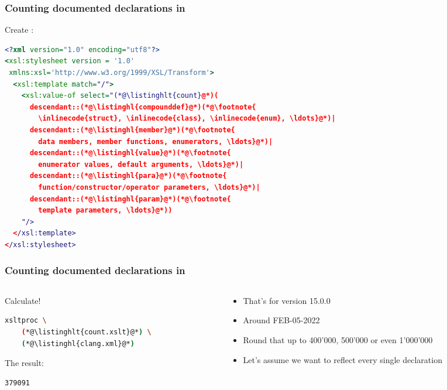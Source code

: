 \documentclass[compress,table,xcolor=table]{beamer}
\begin{document}
\begin{frame}[fragile]
  \frametitle{Counting documented declarations in }
  Create :
  \begin{lstlisting}[language=xslt,basicstyle=\scriptsize\ttfamily]
<?xml version="1.0" encoding="utf8"?>
<xsl:stylesheet version = '1.0'
 xmlns:xsl='http://www.w3.org/1999/XSL/Transform'>
  <xsl:template match="/">
    <xsl:value-of select="(*@\listinghlt{count}@*)(
      descendant::(*@\listinghl{compounddef}@*)(*@\footnote{
        \inlinecode{struct}, \inlinecode{class}, \inlinecode{enum}, \ldots}@*)|
      descendant::(*@\listinghl{member}@*)(*@\footnote{
        data members, member functions, enumerators, \ldots}@*)|
      descendant::(*@\listinghl{value}@*)(*@\footnote{
        enumerator values, default arguments, \ldots}@*)|
      descendant::(*@\listinghl{para}@*)(*@\footnote{
        function/constructor/operator parameters, \ldots}@*)|
      descendant::(*@\listinghl{param}@*)(*@\footnote{
        template parameters, \ldots}@*))
    "/>
  </xsl:template>
</xsl:stylesheet>
  \end{lstlisting}
\end{frame}
\begin{frame}[fragile]
  \frametitle{Counting documented declarations in }
  \begin{columns}
    \begin{column}{.35\textwidth}
      \Large
      Calculate!
      \begin{lstlisting}[language=bash,basicstyle=\small\ttfamily]
xsltproc \
    (*@\listinghlt{count.xslt}@*) \
    (*@\listinghl{clang.xml}@*)
      \end{lstlisting}
      The result:
      \begin{verbatim}
379091
      \end{verbatim}
    \end{column}
    \begin{column}{.55\textwidth}
      \large
      \begin{itemize}
        \item That's for version 15.0.0
        \item Around FEB-05-2022
        \item Round that up to 400'000, 500'000 or even 1'000'000
        \item Let's assume we want to reflect every single declaration
      \end{itemize}
    \end{column}
  \end{columns}
\end{frame}
\end{document}
